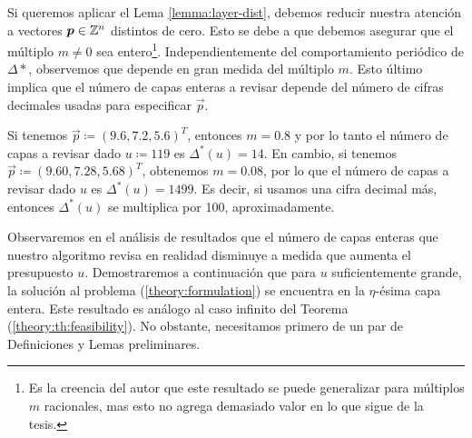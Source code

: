 Si queremos aplicar el Lema \ref{lemma:layer-dist}, debemos reducir nuestra atención a vectores
$\boldsymbol{p} \in \mathbb{Z}^n$ distintos de cero. Esto se debe a que debemos asegurar que el múltiplo $m \neq 0$
sea entero\footnote{Es la creencia del autor que este resultado se puede generalizar para múltiplos
$m$ racionales, mas esto no agrega demasiado valor en lo que sigue de la tesis.}. Independientemente
del comportamiento periódico de $\Delta*$, observemos que depende en gran medida del múltiplo $m$.
Esto último implica que el número de capas enteras a revisar depende del número de cifras decimales
usadas para especificar $\vec{p}$.

\begin{example}
	Si tenemos $\vec{p} \coloneq (9.6, 7.2, 5.6)^T$, entonces $m = 0.8$ y por lo tanto el número de
	capas a revisar dado $u \coloneq 119$ es $\Delta^*(u) = 14$. En cambio, si tenemos $\vec{p} \coloneq
	(9.60, 7.28, 5.68)^T$, obtenemos $m = 0.08$, por lo que el número de capas a revisar dado $u$ es
	$\Delta^*(u) = 1499$. Es decir, si usamos una cifra decimal más, entonces $\Delta^*(u)$ se
	multiplica por 100, aproximadamente.
\end{example}

Observaremos en el análisis de resultados que el número de capas enteras que nuestro algoritmo
revisa en realidad disminuye a medida que aumenta el presupuesto $u$. Demostraremos a continuación
que para $u$ suficientemente grande, la solución al problema (\ref{theory:formulation}) se encuentra
en la $\eta$-ésima capa entera. Este resultado es análogo al caso infinito del Teorema
(\ref{theory:th:feasibility}). No obstante, necesitamos primero de un par de Definiciones y Lemas
preliminares.


